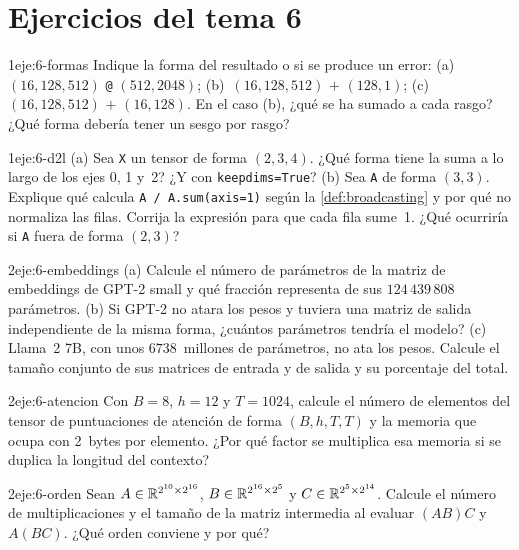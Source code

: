 \section*{Ejercicios del tema 6}

\begin{ejercicio}{1}{eje:6-formas}
Indique la forma del resultado o si se produce un error: (a)~$(16,128,512)$ \texttt{@} $(512,2048)$; (b)~$(16,128,512)$ $+$ $(128,1)$; (c)~$(16,128,512)$ $+$ $(16,128)$. En el caso (b), ¿qué se ha sumado a cada rasgo? ¿Qué forma debería tener un sesgo por rasgo?
\end{ejercicio}

\begin{ejercicio}{1}{eje:6-d2l}
(a) Sea \texttt{X} un tensor de forma $(2,3,4)$. ¿Qué forma tiene la suma a lo largo de los ejes 0, 1 y~2? ¿Y con \texttt{keepdims=True}? (b) Sea \texttt{A} de forma $(3,3)$. Explique qué calcula \texttt{A / A.sum(axis=1)} según la \cref{def:broadcasting} y por qué no normaliza las filas. Corrija la expresión para que cada fila sume~1. ¿Qué ocurriría si \texttt{A} fuera de forma $(2,3)$?
\end{ejercicio}

\begin{ejercicio}{2}{eje:6-embeddings}
(a) Calcule el número de parámetros de la matriz de embeddings de GPT-2 small y qué fracción representa de sus $124\,439\,808$ parámetros. (b) Si GPT-2 no atara los pesos y tuviera una matriz de salida independiente de la misma forma, ¿cuántos parámetros tendría el modelo? (c) Llama~2 7B, con unos $6738$~millones de parámetros, no ata los pesos. Calcule el tamaño conjunto de sus matrices de entrada y de salida y su porcentaje del total.
\end{ejercicio}

\begin{ejercicio}{2}{eje:6-atencion}
Con $B=8$, $h=12$ y $T=1024$, calcule el número de elementos del tensor de puntuaciones de atención de forma $(B,h,T,T)$ y la memoria que ocupa con 2~bytes por elemento. ¿Por qué factor se multiplica esa memoria si se duplica la longitud del contexto?
\end{ejercicio}

\begin{ejercicio}{2}{eje:6-orden}
Sean $A\in\mathbb{R}^{2^{10}\times 2^{16}}$, $B\in\mathbb{R}^{2^{16}\times 2^{5}}$ y $C\in\mathbb{R}^{2^{5}\times 2^{14}}$. Calcule el número de multiplicaciones y el tamaño de la matriz intermedia al evaluar $(AB)C$ y $A(BC)$. ¿Qué orden conviene y por qué?
\end{ejercicio}

